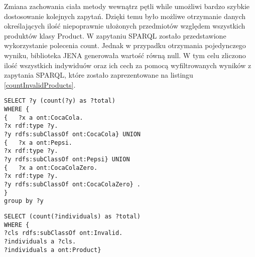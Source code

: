 \begin{itemize}
Zmiana zachowania ciała metody wewnątrz pętli while umożliwi bardzo szybkie dostosowanie kolejnych zapytań. Dzięki temu było możliwe otrzymanie danych określających ilość niepoprawnie ułożonych przedmiotów względem wszystkich produktów klasy Product. W zapytaniu SPARQL zostało przedstawione wykorzystanie polecenia count. Jednak w przypadku otrzymania pojedynczego wyniku, biblioteka JENA generowała wartość równą null. W tym celu zliczono ilość wszystkich indywiduów oraz ich cech za pomocą wyfiltrowanych wyników z zapytania SPARQL, które zostało zaprezentowane na listingu \ref{countInvalidProducts}.

\begin{lstlisting}[caption={Zapytanie SPARQL zliczające ilość sklasyfikowanych indywiduów.}, label={sparqlCountProducts}]
SELECT ?y (count(?y) as ?total)
WHERE { 
{	?x a ont:CocaCola. 
?x rdf:type ?y. 
?y rdfs:subClassOf ont:CocaCola} UNION 
{ 	?x a ont:Pepsi.   
?x rdf:type ?y.  
?y rdfs:subClassOf ont:Pepsi} UNION 
{	?x a ont:CocaColaZero.  
?x rdf:type ?y. 
?y rdfs:subClassOf ont:CocaColaZero} . 
}
group by ?y
\end{lstlisting}

\begin{lstlisting}[caption={Zliczenie niepoprawnie ułożonych przedmiotów.}, label={countInvalidProducts}]
SELECT (count(?individuals) as ?total)
WHERE {
?cls rdfs:subClassOf ont:Invalid.
?individuals a ?cls.
?individuals a ont:Product}
\end{lstlisting}




\end{itemize}